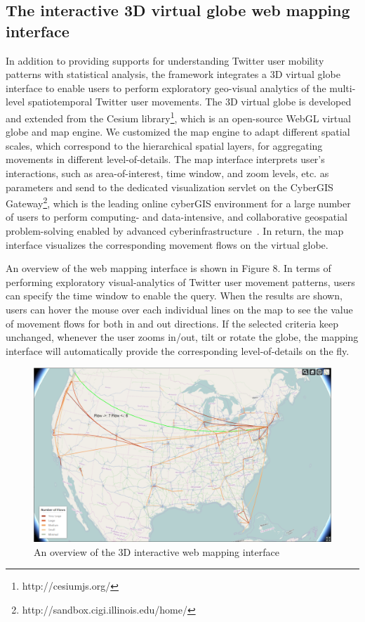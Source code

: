 \documentclass[ijgi,article,submit,moreauthors,pdftex,10pt,a4paper]{mdpi}
\theoremstyle{mdpi}
\newcounter{ex}
\newcounter{re}
\theoremstyle{mdpidefinition}
\begin{document}
\subsection{The interactive 3D virtual globe web mapping interface}
In addition to providing supports for understanding Twitter user mobility patterns with statistical analysis, the framework integrates a 3D virtual globe interface to enable users to perform exploratory geo-visual analytics of the multi-level spatiotemporal Twitter user movements. 
The 3D virtual globe is developed and extended from the Cesium library\footnote{http://cesiumjs.org/}, which is an open-source WebGL virtual globe and map engine. 
We customized the map engine to adapt different spatial scales, which correspond to the hierarchical spatial layers,  for aggregating movements in different level-of-details.
The map interface interprets user's interactions, such as area-of-interest, time window, and zoom levels, etc. as parameters and send to the dedicated visualization servlet on the CyberGIS Gateway\footnote{http://sandbox.cigi.illinois.edu/home/}, which is the leading online cyberGIS environment for a large number of users to perform computing- and data-intensive, and collaborative geospatial problem-solving enabled by advanced cyberinfrastructure~\cite{liu2014cybergis}.
In return, the map interface visualizes the corresponding movement flows on the virtual globe.

An overview of the web mapping interface is shown in Figure 8. In terms of performing exploratory visual-analytics of Twitter user movement patterns, users can specify the time window to enable the query. 
When the results are shown, users can hover the mouse over each individual lines on the map to see the value of movement flows for both in and out directions. If the selected criteria keep unchanged, whenever the user zooms in/out, tilt or rotate the globe, the mapping interface will automatically provide the corresponding level-of-details on the fly.

\begin{figure}[h]
\centering
\includegraphics[width=0.8\linewidth]{./figures/vocation}
\caption{An overview of the 3D interactive web mapping interface}
\label{fig:Web_Interface}
\end{figure}
\FloatBarrier
\end{document}
